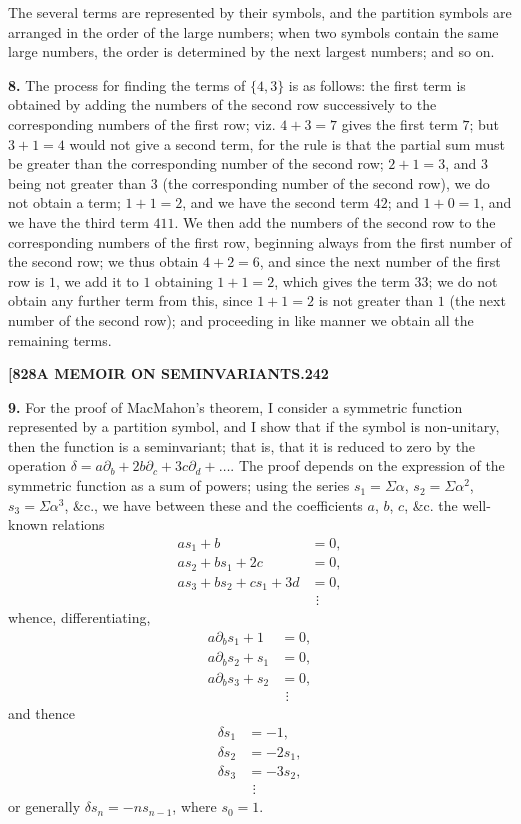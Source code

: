 \documentclass[11pt,a4paper]{book}
\begin{document}
The several terms are represented by their symbols, and the partition symbols are arranged in the order of the large numbers; when two symbols contain the same large numbers, the order is determined by the next largest numbers; and so on.

\noindent\textbf{8.} The process for finding the terms of $\{4, 3\}$ is as follows: the first term is obtained by adding the numbers of the second row successively to the corresponding numbers of the first row; viz. $4 + 3 = 7$ gives the first term $7$; but $3 + 1 = 4$ would not give a second term, for the rule is that the partial sum must be greater than the corresponding number of the second row; $2 + 1 = 3$, and $3$ being not greater than $3$ (the corresponding number of the second row), we do not obtain a term; $1 + 1 = 2$, and we have the second term $42$; and $1 + 0 = 1$, and we have the third term $411$. We then add the numbers of the second row to the corresponding numbers of the first row, beginning always from the first number of the second row; we thus obtain $4 + 2 = 6$, and since the next number of the first row is $1$, we add it to $1$ obtaining $1 + 1 = 2$, which gives the term $33$; we do not obtain any further term from this, since $1 + 1 = 2$ is not greater than $1$ (the next number of the second row); and proceeding in like manner we obtain all the remaining terms.

\newpage
\setcounter{page}{242}

\noindent\textbf{[828}\hfill\textbf{A MEMOIR ON SEMINVARIANTS.}\hfill\textbf{242}

\bigskip

\noindent\textbf{9.} For the proof of MacMahon's theorem, I consider a symmetric function represented by a partition symbol, and I show that if the symbol is non-unitary, then the function is a seminvariant; that is, that it is reduced to zero by the operation $\delta = a\partial_b + 2b\partial_c + 3c\partial_d + \dots$. The proof depends on the expression of the symmetric function as a sum of powers; using the series $s_1 = \Sigma\alpha$, $s_2 = \Sigma\alpha^2$, $s_3 = \Sigma\alpha^3$, \&c., we have between these and the coefficients $a$, $b$, $c$, \&c. the well-known relations
\begin{align*}
as_1 + b &= 0, \\
as_2 + bs_1 + 2c &= 0, \\
as_3 + bs_2 + cs_1 + 3d &= 0, \\
&\ \,\vdots
\end{align*}
whence, differentiating,
\begin{align*}
a\partial_b s_1 + 1 &= 0, \\
a\partial_b s_2 + s_1 &= 0, \\
a\partial_b s_3 + s_2 &= 0, \\
&\ \,\vdots
\end{align*}
and thence
\begin{align*}
\delta s_1 &= -1, \\
\delta s_2 &= -2s_1, \\
\delta s_3 &= -3s_2, \\
&\ \,\vdots
\end{align*}
or generally $\delta s_n = -ns_{n-1}$, where $s_0 = 1$.
\end{document}
